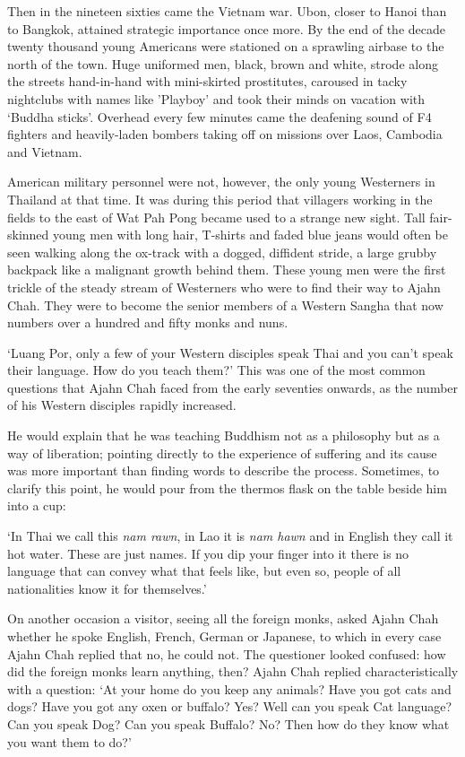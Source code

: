Then in the nineteen sixties came the Vietnam war. Ubon, closer to Hanoi
than to Bangkok, attained strategic importance once more. By the end of
the decade twenty thousand young Americans were stationed on a sprawling
airbase to the north of the town. Huge uniformed men, black, brown and
white, strode along the streets hand-in-hand with mini-skirted
prostitutes, caroused in tacky nightclubs with names like 'Playboy' and
took their minds on vacation with `Buddha sticks'. Overhead every few
minutes came the deafening sound of F4 fighters and heavily-laden
bombers taking off on missions over Laos, Cambodia and Vietnam. 

American military personnel were not, however, the only young Westerners
in Thailand at that time. It was during this period that villagers
working in the fields to the east of Wat Pah Pong became used to a
strange new sight. Tall fair-skinned young men with long hair, T-shirts
and faded blue jeans would often be seen walking along the ox-track with
a dogged, diffident stride, a large grubby backpack like a malignant
growth behind them. These young men were the first trickle of the steady
stream of Westerners who were to find their way to Ajahn Chah. They were
to become the senior members of a Western Sangha that now numbers over a
hundred and fifty monks and nuns. 

`Luang Por, only a few of your Western disciples speak Thai and you
can't speak their language. How do you teach them?' This was one of the
most common questions that Ajahn Chah faced from the early seventies
onwards, as the number of his Western disciples rapidly increased.

He would explain that he was teaching Buddhism not as a philosophy but as a
way of liberation; pointing directly to the experience of suffering and
its cause was more important than finding words to describe the process. 
Sometimes, to clarify this point, he would pour from the thermos flask
on the table beside him into a cup: 

`In Thai we call this \emph{nam rawn}, in Lao it is \emph{nam hawn} and
in English they call it hot water. These are just names. If you dip
your finger into it there is no language that can convey what that feels
like, but even so, people of all nationalities know it for themselves.'

On another occasion a visitor, seeing all the foreign monks, asked Ajahn
Chah whether he spoke English, French, German or Japanese, to which in
every case Ajahn Chah replied that no, he could not. The questioner
looked confused: how did the foreign monks learn anything, then? Ajahn
Chah replied characteristically with a question: `At your home do you
keep any animals? Have you got cats and dogs? Have you got any oxen or
buffalo? Yes? Well can you speak Cat language? Can you speak Dog? Can
you speak Buffalo? No? Then how do they know what you want them to do?'

